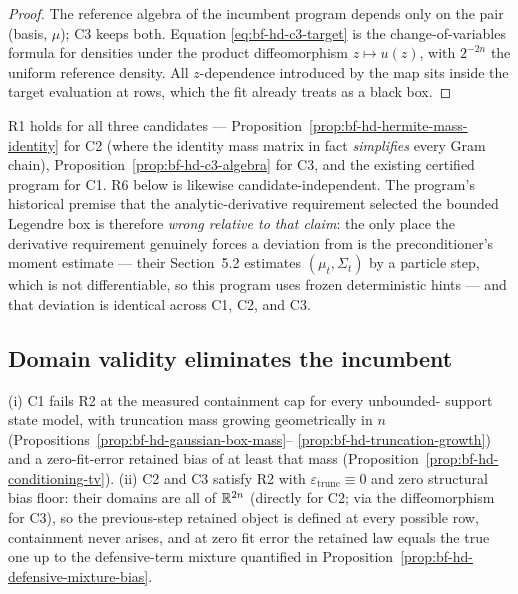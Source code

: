 \begin{proof}
The reference algebra of the incumbent program depends only on the pair
(basis, \(\mu\)); C3 keeps both.  Equation \eqref{eq:bf-hd-c3-target} is
the change-of-variables formula for densities under the product
diffeomorphism \(z\mapsto u(z)\), with \(2^{-2n}\) the uniform reference
density.  All \(z\)-dependence introduced by the map sits inside the
target evaluation at rows, which the fit already treats as a black box.
\end{proof}

\begin{remark}
\label{rem:bf-hd-no-forcing}
R1 holds for all three candidates ---
Proposition~\ref{prop:bf-hd-hermite-mass-identity} for C2 (where the
identity mass matrix in fact \emph{simplifies} every Gram chain),
Proposition~\ref{prop:bf-hd-c3-algebra} for C3, and the existing
certified program for C1.  R6 below is likewise
candidate-independent.  The program's historical premise that the
analytic-derivative requirement selected the bounded Legendre box is
therefore \emph{wrong relative to that claim}: the only place the
derivative requirement genuinely forces a deviation from
\citet{zhao2024ttsequential} is the preconditioner's moment estimate ---
their Section~5.2 estimates \((\mu_t,\Sigma_t)\) by a particle step,
which is not differentiable, so this program uses frozen deterministic
hints --- and that deviation is identical across C1, C2, and C3.
\end{remark}

\subsection{Domain validity eliminates the incumbent}

\begin{proposition}
\label{prop:bf-hd-domain-scorecard}
(i) C1 fails R2 at the measured containment cap for every unbounded-%
support state model, with truncation mass growing geometrically in \(n\)
(Propositions~\ref{prop:bf-hd-gaussian-box-mass}--%
\ref{prop:bf-hd-truncation-growth}) and a zero-fit-error retained bias of
at least that mass (Proposition~\ref{prop:bf-hd-conditioning-tv}).
(ii) C2 and C3 satisfy R2 with
\(\varepsilon_{\mathrm{trunc}}\equiv0\) and zero structural bias floor:
their domains are all of \(\mathbb{R}^{2n}\) (directly for C2; via the
diffeomorphism for C3), so the previous-step retained object is defined
at every possible row, containment never arises, and at zero fit error
the retained law equals the true one up to the defensive-term mixture
quantified in Proposition~\ref{prop:bf-hd-defensive-mixture-bias}.
\end{proposition}

